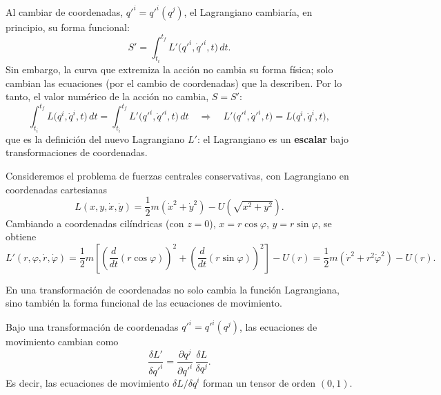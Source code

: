 Al cambiar de coordenadas, $q'^i=q'^i(q^j)$, el Lagrangiano cambiaría, en
principio, su forma funcional:
\[
S' = \int_{t_i}^{t_f} L'\big(q'^i,\dot q'^i,t\big)\, dt .
\]
Sin embargo, la curva que extremiza la acción no cambia su forma física;
solo cambian las ecuaciones (por el cambio de coordenadas) que la
describen. Por lo tanto, el valor numérico de la acción no cambia,
$S=S'$:
\[
\int_{t_i}^{t_f} L\big(q^i,\dot q^i,t\big)\, dt = \int_{t_i}^{t_f}
L'\big(q'^i,\dot q'^i,t\big)\, dt \quad\Longrightarrow\quad
L'\big(q'^i,\dot q'^i,t\big) = L\big(q^i,\dot q^i,t\big),
\]
que es la definición del nuevo Lagrangiano $L'$: el Lagrangiano es un
\textbf{escalar} bajo transformaciones de coordenadas.

\begin{ejemplo}
Consideremos el problema de fuerzas centrales conservativas, con
Lagrangiano en coordenadas cartesianas
\[
L(x,y,\dot x,\dot y) = \frac{1}{2}m(\dot x^2+\dot y^2) -
U\!\left(\sqrt{x^2+y^2}\right).
\]
Cambiando a coordenadas cilíndricas (con $z=0$), $x=r\cos\varphi$,
$y=r\sin\varphi$, se obtiene
\[
L'(r,\varphi,\dot r,\dot\varphi) = \frac{1}{2}m\left[\left(\frac{d}{dt}
(r\cos\varphi)\right)^2 + \left(\frac{d}{dt}(r\sin\varphi)\right)^2
\right] - U(r) = \frac{1}{2}m\left(\dot r^2 + r^2\dot\varphi^2\right) -
U(r).
\]
\end{ejemplo}

En una transformación de coordenadas no solo cambia la función
Lagrangiana, sino también la forma funcional de las ecuaciones de
movimiento.

\begin{proposicionc}
Bajo una transformación de coordenadas $q'^i=q'^i(q^j)$, las ecuaciones
de movimiento cambian como
\[
\frac{\delta L'}{\delta q'^i} = \frac{\partial q^j}{\partial q'^i}\,
\frac{\delta L}{\delta q^j} .
\]
Es decir, las ecuaciones de movimiento $\delta L/\delta q^i$ forman un
tensor de orden $(0,1)$.
\end{proposicionc}

